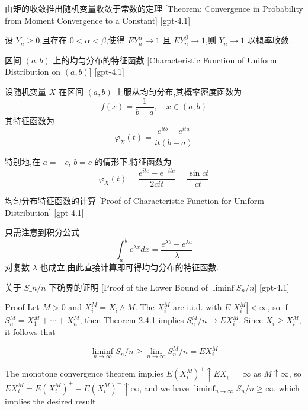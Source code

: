 \documentclass[UTF8]{ctexart}
\begin{document}
    
    
    \begin{thm}
        {由矩的收敛推出随机变量收敛于常数的定理}
        [Theorem: Convergence in Probability from Moment Convergence to a Constant]
        [gpt-4.1]
        
设 $Y_n \geq 0$,且存在 $0 < \alpha < \beta$,使得 $E Y_n^{\alpha} \to 1$ 且 $E Y_n^{\beta} \to 1$,则 $Y_n \to 1$ 以概率收敛.

    \end{thm}
    
    
    
    \begin{xmp}
        {区间 $(a, b)$ 上的均匀分布的特征函数}
        [Characteristic Function of Uniform Distribution on $(a, b)$]
        [gpt-4.1]
        
设随机变量 $X$ 在区间 $(a, b)$ 上服从均匀分布,其概率密度函数为
\[
f(x) = \frac{1}{b - a}, \quad x \in (a, b)
\]
其特征函数为
\[
\varphi_X(t) = \frac{e^{i t b} - e^{i t a}}{i t (b - a)}
\]

特别地,在 $a = -c$, $b = c$ 的情形下,特征函数为
\[
\varphi_X(t) = \frac{e^{i t c} - e^{-i t c}}{2 c i t} = \frac{\sin c t}{c t}
\]

    \end{xmp}
    
    
    
    \begin{prf}
        {均匀分布特征函数的计算}
        [Proof of Characteristic Function for Uniform Distribution]
        [gpt-4.1]
        
只需注意到积分公式
\[
\int_{a}^{b} e^{\lambda x} dx = \frac{e^{\lambda b} - e^{\lambda a}}{\lambda}
\]
对复数 $\lambda$ 也成立,由此直接计算即可得均匀分布的特征函数.

    \end{prf}
    
    
    
    \begin{prf}
        {关于 $S\_n/n$ 下确界的证明}
        [Proof of the Lower Bound of $\liminf S_n/n$]
        [gpt-4.1]
        
Proof Let $M > 0$ and $X_{i}^{M} = X_{i} \wedge M$.
The $X_{i}^{M}$ are i.i.d. with $E | X_{i}^{M} | < \infty$, so if $S_{n}^{M} = X_{1}^{M} + \cdots + X_{n}^{M}$, then Theorem 2.4.1 implies $S_{n}^{M} / n \to E X_{i}^{M}$.
Since $X_{i} \geq X_{i}^{M}$, it follows that

\[
\liminf_{n \to \infty} S_{n} / n \geq \lim_{n \to \infty} S_{n}^{M} / n = E X_{i}^{M}
\]

The monotone convergence theorem implies $E (X_{i}^{M})^{+} \uparrow E X_{i}^{+} = \infty$ as $M \uparrow \infty$, so $E X_{i}^{M} = E (X_{i}^{M})^{+} - E (X_{i}^{M})^{-} \uparrow \infty$, and we have $\liminf_{n \to \infty} S_{n} / n \geq \infty$, which implies the desired result.

    \end{prf}
    
\end{document}
